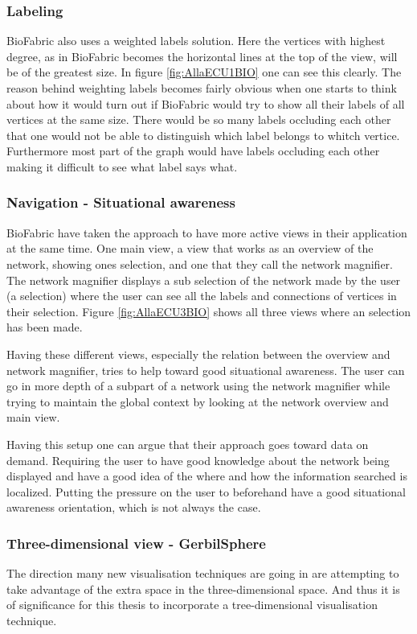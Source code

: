 \documentclass[a4paper,11pt]{kth-mag}
\begin{document}
 \subsubsection{Labeling}
BioFabric also uses a weighted labels solution. Here the vertices with highest degree, as in BioFabric becomes the horizontal lines at the top of the view, will be of the greatest size.  
In figure \ref{fig:AllaECU1BIO} one can see this clearly. The reason behind weighting labels becomes fairly obvious when one
starts to think about how it would turn out if BioFabric would try to show all their labels of all vertices at the same 
size. There would be so many labels occluding each other that one would not be able to distinguish which label
belongs to whitch vertice. Furthermore most part of the graph would have labels occluding each other making it
difficult to see what label says what.
\subsubsection{Navigation - Situational awareness}
BioFabric have taken the approach to have more active views in their application at the same time. One main 
view, a view that works as an overview of the network, showing ones selection, and one that they call the network magnifier. The network 
magnifier displays a sub selection of the network made by the user (a selection) where the user can see all the labels and
connections of vertices in their selection. Figure \ref{fig:AllaECU3BIO} shows all three views where an selection has been made. 

Having these different views, especially the relation between the overview and  network magnifier, tries to 
help toward good situational awareness. The user can go in more depth of a subpart of a network using the network magnifier while trying to maintain the global 
context by looking at the network overview and main view. 

Having this setup one can argue that their approach goes toward data on demand. Requiring the user 
to have good knowledge about the network being displayed and have a good idea of the where and how the
information searched is localized. Putting the pressure on the user to beforehand have a good situational 
awareness orientation, which is not always the case.
 
\subsubsection{Three-dimensional view - GerbilSphere}
The direction many new visualisation techniques are going in are attempting to take advantage of the extra space in the three-dimensional space. And thus it is of significance for this thesis to incorporate a 
tree-dimensional visualisation technique. 
\end{document}
